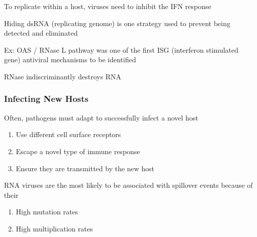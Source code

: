 \documentclass{notes}
\begin{document}
To replicate within a host, viruses need to inhibit the IFN response

\tab \indicates Hiding dsRNA (replicating genome) is one strategy used to prevent being detected and eliminated


Ex: OAS / RNase L pathway was one of the first ISG (interferon stimulated gene) antiviral mechanisms to be identified

\tab \indicates RNase indiscriminantly destroys RNA

\subsubsection{Infecting New Hosts}

Often, pathogens must adapt to successfully infect a novel host

\begin{enumerate}
    \item Use different cell surface receptors
    \item Escape a novel type of immune response
    \item Ensure they are transmitted by the new host
\end{enumerate}

RNA viruses are the most likely to be associated with spillover events because of their

\begin{enumerate}
    \item High mutation rates
    \item High multiplication rates
\end{enumerate}
\end{document}
